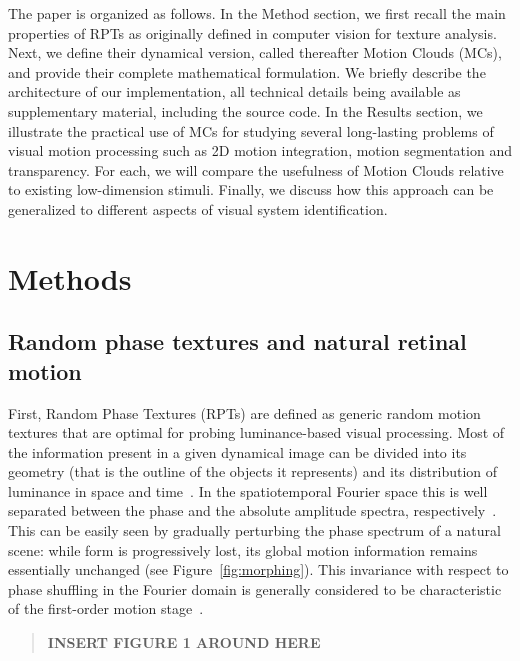 \documentclass[a4paper,11pt]{article}%
\begin{document}
The paper is organized as follows. In the Method section, we first recall the main properties of  RPTs as originally defined in computer vision for texture analysis. Next, we define their dynamical version, called thereafter Motion Clouds (MCs), and provide their complete mathematical formulation. We briefly describe the architecture of our implementation, all technical details being available as supplementary material, including the source code. In the Results section, we illustrate the practical use of MCs for studying several long-lasting problems of visual motion processing such as 2D motion integration, motion segmentation and transparency. For each, we will compare the usefulness of Motion Clouds relative to existing low-dimension stimuli. Finally, we discuss how this approach can be generalized to different aspects of visual system identification. %
\section{Methods}\label{section:Methods}
\subsection{Random phase textures and natural retinal motion}\label{subsection:random_phase_textures}
First, Random Phase Textures (RPTs) are defined as generic random motion textures that are optimal for probing luminance-based visual processing. Most of the information present in a given dynamical image can be divided into its geometry (that is the outline of the objects it represents) and its distribution of luminance in space and time~\citep{Neri98,Perrone01,Perrone02,Jasinschi92}. In the spatiotemporal Fourier space this is well separated between the phase and the absolute amplitude spectra, respectively~\citep{Oppenheim81}. This can be easily seen by gradually perturbing the phase spectrum of a natural scene: while form is progressively lost, its global motion information remains essentially unchanged (see Figure~\ref{fig:morphing}). This invariance with respect to phase shuffling in the Fourier domain is generally considered to be characteristic of the first-order motion stage~\citep{Lu01,Derrington04}. 

\begin{quote}
	\begin{center}
		\textbf{INSERT FIGURE 1 AROUND HERE}
	\end{center}
\end{quote}
\end{document}
